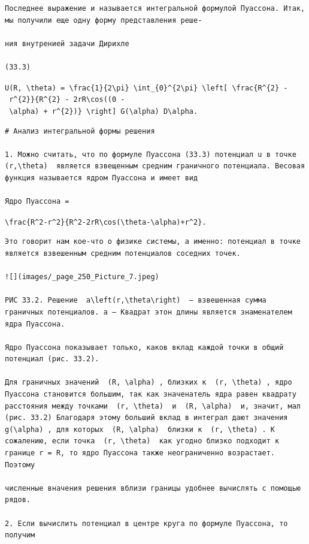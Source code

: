 \documentclass[
  ukrainian,
]{article}
\begin{document}
\begin{verbatim}
Последнее выражение и называется интегральной формулой Пуассона. Итак, мы получили еще одну форму представления реше-

ния внутренией задачи Дирихле

(33.3)
\end{verbatim}

\texttt{U(R,\ \textbackslash{}theta)\ =\ \textbackslash{}frac\{1\}\{2\textbackslash{}pi\}\ \textbackslash{}int\_\{0\}\^{}\{2\textbackslash{}pi\}\ \textbackslash{}left{[}\ \textbackslash{}frac\{R\^{}\{2\}\ -\ r\^{}\{2\}\}\{R\^{}\{2\}\ -\ 2rR\textbackslash{}cos((0\ -\ \textbackslash{}alpha)\ +\ r\^{}\{2\})\}\ \textbackslash{}right{]}\ G(\textbackslash{}alpha)\ D\textbackslash{}alpha.}

\begin{verbatim}
# Анализ интегральной формы решения

1. Можно считать, что по формуле Пуассона (33.3) потенциал u в точке  (r,\theta)  является взвещенным средним граничного потенциала. Весовая функция называется ядром Пуассона и имеет вид

Ядро Пуассона =
\end{verbatim}

\texttt{\textbackslash{}frac\{R\^{}2-r\^{}2\}\{R\^{}2-2rR\textbackslash{}cos(\textbackslash{}theta-\textbackslash{}alpha)+r\^{}2\}.}

\begin{verbatim}
Это говорит нам кое-что о физике системы, а именно: потенциал в точке является взвешенным средним потенциалов соседних точек.

![](images/_page_250_Picture_7.jpeg)

РИС 33.2. Решение  a\left(r,\theta\right)  — взвешенная сумма граничных потенциалов. a — Квадрат этон длины является знаменателем ядра Пуассона.

Ядро Пуассона показывает только, каков вклад каждой точки в общий потенциал (рис. 33.2).

Для граничных значений  (R, \alpha) , близких к  (r, \theta) , ядро Пуассона становится большим, так как значенатель ядра равен квадрату расстояния между точками  (r, \theta)  и  (R, \alpha)  и, значит, мал (рис. 33.2) Благодаря этому больший вклад в интеграл дают значения  g(\alpha) , для которых  (R, \alpha)  близки к  (r, \theta) . К сожалению, если точка  (r, \theta)  как угодно близко подходит к границе r = R, то ядро Пуассона также неограниченно возрастает. Поэтому

численные вначения решения вблизи границы удобнее вычислять с помощью рядов.

2. Если вычислить потенциал в центре круга по формуле Пуассона, то получим
\end{verbatim}
\end{document}
